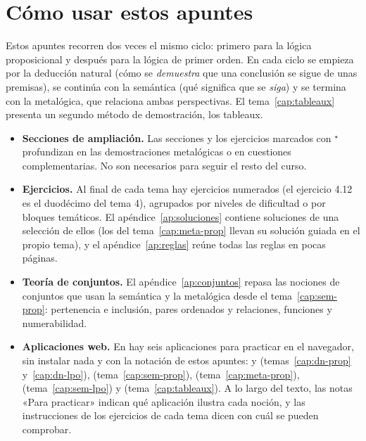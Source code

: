 \documentclass[spanish,11pt,a4paper,openany]{book}
\begin{document}
\setcounter{tocdepth}{1}
\tableofcontents

\chapter*{Cómo usar estos apuntes}

Estos apuntes recorren dos veces el mismo ciclo: primero para la
lógica proposicional y después para la lógica de primer orden. En cada
ciclo se empieza por la deducción natural (cómo se \emph{demuestra}
que una conclusión se sigue de unas premisas), se continúa con la
semántica (qué significa que se \emph{siga}) y se termina con la metalógica, que relaciona ambas perspectivas. El tema~\ref{cap:tableaux} presenta un segundo método de demostración, los tableaux.

\begin{itemize}
    \item \textbf{Secciones de ampliación.} Las secciones y los ejercicios marcados con $^{\star}$ profundizan en las demostraciones metalógicas o en cuestiones complementarias. No son necesarios para seguir el resto del curso.
    \item \textbf{Ejercicios.} Al final de cada tema hay ejercicios numerados (el ejercicio 4.12 es el duodécimo del tema 4), agrupados por niveles de dificultad o por bloques temáticos. El apéndice~\ref{ap:soluciones} contiene soluciones de una selección de ellos (los del tema~\ref{cap:meta-prop} llevan su solución guiada en el propio tema), y el apéndice~\ref{ap:reglas} reúne todas las reglas en pocas páginas.
    \item \textbf{Teoría de conjuntos.} El apéndice~\ref{ap:conjuntos} repasa las nociones de conjuntos que usan la semántica y la metalógica desde el tema~\ref{cap:sem-prop}: pertenencia e inclusión, pares ordenados y relaciones, funciones y numerabilidad.
    \item \textbf{Aplicaciones web.} En \webaplicaciones{} hay seis aplicaciones para practicar en el navegador, sin instalar nada y con la notación de estos apuntes: \appsintaxis{} y \appdeduccion{} (temas~\ref{cap:dn-prop} y~\ref{cap:dn-lpo}), \apptablas{} (tema~\ref{cap:sem-prop}), \appkalmar{} (tema~\ref{cap:meta-prop}), \appmundo{} (tema~\ref{cap:sem-lpo}) y \apptableaux{} (tema~\ref{cap:tableaux}). A lo largo del texto, las notas «Para practicar» indican qué aplicación ilustra cada noción, y las instrucciones de los ejercicios de cada tema dicen con cuál se pueden comprobar.
\end{itemize}
\end{document}
